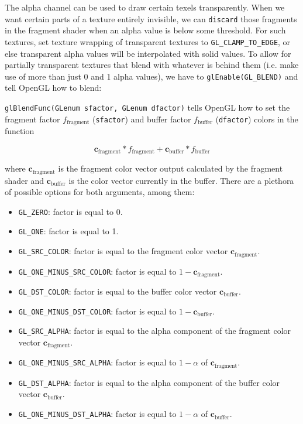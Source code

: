 \documentclass[8pt, table, xcdraw]{article}%
\begin{document}
The alpha channel can be used to draw certain texels transparently. When we want certain parts of a texture entirely invisible, we can \lstinline{discard} those fragments in the fragment shader when an alpha value is below some threshold. For such textures, set texture wrapping of transparent textures to \lstinline{GL_CLAMP_TO_EDGE}, or else transparent alpha values will be interpolated with solid values. To allow for partially transparent textures that blend with whatever is behind them (i.e. make use of more than just 0 and 1 alpha values), we have to \lstinline{glEnable(GL_BLEND)} and tell OpenGL how to blend:

\lstinline{glBlendFunc(GLenum sfactor, GLenum dfactor)} tells OpenGL how to set the fragment factor $f_\text{fragment}$ (\lstinline{sfactor}) and buffer factor $f_\text{buffer}$ (\lstinline{dfactor}) colors in the function

\begin{equation}
    \bm{c}_\text{fragment} * f_\text{fragment} + \bm{c}_\text{buffer} * f_\text{buffer}
\end{equation}

where $\bm{c}_\text{fragment}$ is the fragment color vector output calculated by the fragment shader and $\bm{c}_\text{buffer}$ is the color vector currently in the buffer. There are a plethora of possible options for both arguments, among them:

\begin{itemize}
    \item \lstinline{GL_ZERO}: factor is equal to 0.
    \item \lstinline{GL_ONE}: factor is equal to 1.
    \item \lstinline{GL_SRC_COLOR}: factor is equal to the fragment color vector $\bm{c}_\text{fragment}$.
    \item \lstinline{GL_ONE_MINUS_SRC_COLOR}: factor is equal to $1 - \bm{c}_\text{fragment}$.
    \item \lstinline{GL_DST_COLOR}: factor is equal to the buffer color vector $\bm{c}_\text{buffer}$.
    \item \lstinline{GL_ONE_MINUS_DST_COLOR}: factor is equal to $1 - \bm{c}_\text{buffer}$.
    \item \lstinline{GL_SRC_ALPHA}: factor is equal to the alpha component of the fragment color vector $\bm{c}_\text{fragment}$.
    \item \lstinline{GL_ONE_MINUS_SRC_ALPHA}: factor is equal to $1 - \alpha$ of $\bm{c}_\text{fragment}$.
    \item \lstinline{GL_DST_ALPHA}: factor is equal to the alpha component of the buffer color vector $\bm{c}_\text{buffer}$.
    \item \lstinline{GL_ONE_MINUS_DST_ALPHA}: factor is equal to $1 - \alpha$ of $\bm{c}_\text{buffer}$.
\end{itemize}
\end{document}

